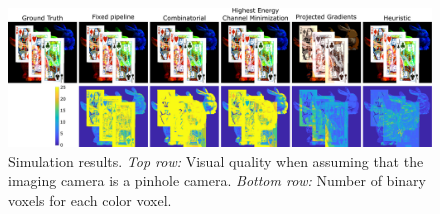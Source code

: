 \begin{figure}[h!]
\centering
\includegraphics[width=0.99\columnwidth]{images/volumetric/acd_exp10/exp_pinhole}
\caption[Adaptive color decomposition: pinhole-camera reconstruction and number of binary voxels]{Simulation results. \emph{Top row:} Visual quality when assuming that the imaging camera is a pinhole camera. \emph{Bottom row:} Number of binary voxels for each color voxel.}
\label{fig:volumetric:acd:exp10:pinhole}
\end{figure}

